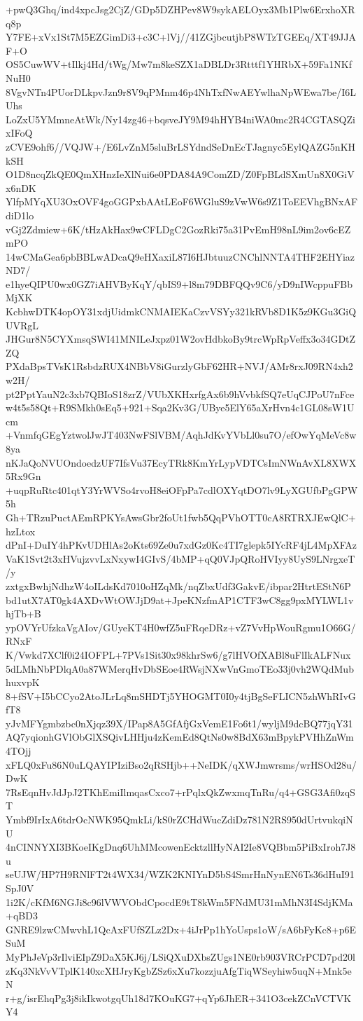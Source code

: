 +pwQ3Ghq/ind4xpcJsg2CjZ/GDp5DZHPev8W9sykAELOyx3Mb1Plw6ErxhoXRq8p
Y7FE+xVx1St7M5EZGimDi3+c3C+lVj//41ZGjbcutjbP8WTzTGEEq/XT49JJAF+O
OS5CuwWV+tIlkj4Hd/tWg/Mw7m8keSZX1aDBLDr3Rtttf1YHRbX+59Fa1NKfNuH0
8VgvNTn4PUorDLkpvJzn9r8V9qPMnm46p4NhTxfNwAEYwlhaNpWEwa7be/I6LUhs
LoZxU5YMmneAtWk/Ny14zg46+bqsveJY9M94hHYB4niWA0mc2R4CGTASQZixIFoQ
zCVE9ohf6//VQJW+/E6LvZnM5sluBrLSYdndSeDnEcTJagnyc5EylQAZG5nKHkSH
O1D8ncqZkQE0QmXHnzIeXlNui6e0PDA84A9ComZD/Z0FpBLdSXmUn8X0GiVx6nDK
YlfpMYqXU3OxOVF4goGGPxbAAtLEoF6WGluS9zVwW6s9Z1ToEEVhgBNxAFdiD1lo
vGj2Zdmiew+6K/tHzAkHax9wCFLDgC2GozRki75a31PvEmH98nL9im2ov6cEZmPO
14wCMaGea6pbBBLwADcaQ9eHXaxiL87I6HJbtuuzCNChlNNTA4THF2EHYiazND7/
e1hyeQIPU0wx0GZ7iAHVByKqY/qbIS9+l8m79DBFQQv9C6/yD9nIWcppuFBbMjXK
KcbhwDTK4opOY31xdjUidmkCNMAIEKaCzvVSYy321kRVb8D1K5z9KGu3GiQUVRgL
JHGur8N5CYXmsqSWI41MNILeJxpz01W2ovHdbkoBy9trcWpRpVeffx3o34GDtZZQ
PXdaBpsTVsK1RsbdzRUX4NBbV8iGurzlyGbF62HR+NVJ/AMr8rxJ09RN4xh2w2H/
pt2PptYauN2c3xb7QBIoS18zrZ/VUbXKHxrfgAx6b9hVvbkfSQ7eUqCJPoU7nFce
w4t5s58Qt+R9SMkh0sEq5+921+Sqa2Kv3G/UBye5ElY65aXrHvn4c1GL08sW1Ucm
+VnmfqGEgYztwolJwJT403NwFSlVBM/AqhJdKvYVbLl0su7O/efOwYqMeVc8w8ya
nKJaQoNVUOndoedzUF7IfsVu37EcyTRk8KmYrLypVDTCsImNWnAvXL8XWX5Rx9Gn
+uqpRuRtc401qtY3YrWVSo4rvoH8eiOFpPa7cdlOXYqtDO7lv9LyXGUfbPgGPW5h
Gh+TRzuPuctAEmRPKYsAwsGbr2foUt1fwb5QqPVhOTT0cA8RTRXJEwQlC+hzLtox
dPnI+DuIY4hPKvUDHlAs2oKts69Ze0u7xdGz0Kc4TI7glepk5IYcRF4jL4MpXFAz
VaK1Svt2t3xHVujzvvLxNxywI4GIvS/4bMP+qQ0VJpQRoHVIyy8UyS9LNrgxeT/y
zxtgxBwhjNdhzW4oILdsKd7010oHZqMk/nqZbxUdf3GakvE/ibpar2HtrtEStN6P
bd1utX7AT0gk4AXDvWtOWJjD9at+JpeKNzfmAP1CTF3wC8gg9pxMYLWL1vhjTb+B
ypOVYrUfzkaVgAIov/GUyeKT4H0wfZ5uFRqeDRz+vZ7VvHpWouRgmu1O66G/RNxF
K/Vwkd7XClf0i24IOFPL+7PVs1Sit30x98khrSw6/g7lHVOfXABl8uFlIkALFNux
5dLMhNbPDlqA0a87WMerqHvDbSEoe4RWsjNXwVnGmoTEo33j0vh2WQdMubhuxvpK
8+fSV+I5bCCyo2AtoJLrLq8mSHDTj5YHOGMT0I0y4tjBgSeFLICN5zhWhRIvGfT8
yJvMFYgmbzbc0nXjqz39X/IPap8A5GfAfjGxVemE1Fo6t1/wyljM9dcBQ77jqY31
AQ7yqionhGVlObGlXSQivLHHju4zKemEd8QtNs0w8BdX63mBpykPVHhZnWm4TOjj
xFLQ0xFu86N0uLQAYIPIziBso2qRSHjb++NeIDK/qXWJmwrsms/wrHSOd28u/DwK
7RsEqnHvJdJpJ2TKhEmiIlmqasCxco7+rPqlxQkZwxmqTnRu/q4+GSG3Afi0zqST
Ymbf9IrIxA6tdrOcNWK95QmkLi/kS0rZCHdWucZdiDz781N2RS950dUrtvukqiNU
4nCINNYXI3BKoeIKgDnq6UhMMcowenEcktzllHyNAI2Ie8VQBbm5PiBxIroh7J8u
seUJW/HP7H9RNlFT2t4WX34/WZK2KNIYnD5bS4SmrHnNynEN6Ts36dHuI91SpJ0V
1i2K/cKfM6NGJi8c96lVWVObdCpocdE9tT8kWm5FNdMU31mMhN3I4SdjKMa+qBD3
GNRE9lzwCMwvhL1QcAxFUfSZLz2Dx+4iJrPp1hYoUsps1oW/sA6bFyKc8+p6ESuM
MyPhJeVp3rIlviEIpZ9DaX5KJ6j/LSiQXuDXbsZUgs1NE0rb903VRCrPCD7pd20l
zKq3NkVvVTplK140xcXHJryKgbZSz6xXu7kozzjuAfgTiqWSeyhiw5uqN+Mnk5eN
r+g/isrEhqPg3j8ikIkwotgqUh18d7KOuKG7+qYp6JhER+341O3cekZCnVCTVKY4
